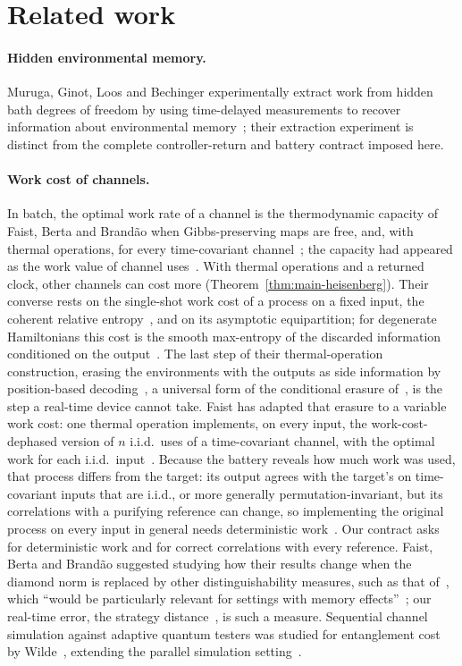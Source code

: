 \section{Related work}\label{sec:related}

\paragraph{Hidden environmental memory.} Muruga, Ginot, Loos and Bechinger experimentally extract work from hidden bath degrees of freedom by using time-delayed measurements to recover information about environmental memory~\cite{MurugaGinotLoosBechinger26}; their extraction experiment is distinct from the complete controller-return and battery contract imposed here.


\paragraph{Work cost of channels.} In batch, the optimal work rate of a channel is the thermodynamic capacity of Faist, Berta and Brand\~ao when Gibbs-preserving maps are free, and, with thermal operations, for every time-covariant channel~\cite{FBB19,FBB21}; the capacity had appeared as the work value of channel uses~\cite{NGP15}. With thermal operations and a returned clock, other channels can cost more (Theorem~\ref{thm:main-heisenberg}). Their converse rests on the single-shot work cost of a process on a fixed input, the coherent relative entropy~\cite{FR18}, and on its asymptotic equipartition; for degenerate Hamiltonians this cost is the smooth max-entropy of the discarded information conditioned on the output~\cite{FDOR15}. The last step of their thermal-operation construction, erasing the environments with the outputs as side information by position-based decoding~\cite[Sec.~7]{FBB21}, a universal form of the conditional erasure of~\cite{delRio11}, is the step a real-time device cannot take. Faist has adapted that erasure to a variable work cost: one thermal operation implements, on every input, the work-cost-dephased version of $n$ i.i.d.\ uses of a time-covariant channel, with the optimal work for each i.i.d.\ input~\cite[Thm.~2]{Faist26}. Because the battery reveals how much work was used, that process differs from the target: its output agrees with the target's on time-covariant inputs that are i.i.d., or more generally permutation-invariant, but its correlations with a purifying reference can change, so implementing the original process on every input in general needs deterministic work~\cite[Prop.~4, Sec.~V]{Faist26}. Our contract asks for deterministic work and for correct correlations with every reference. Faist, Berta and Brand\~ao suggested studying how their results change when the diamond norm is replaced by other distinguishability measures, such as that of~\cite{Chiribella08}, which ``would be particularly relevant for settings with memory effects''~\cite{FBB19}; our real-time error, the strategy distance~\cite{Chiribella08,GutoskiWatrous07}, is such a measure. Sequential channel simulation against adaptive quantum testers was studied for entanglement cost by Wilde~\cite{Wilde18}, extending the parallel simulation setting~\cite{BBCW13}. 